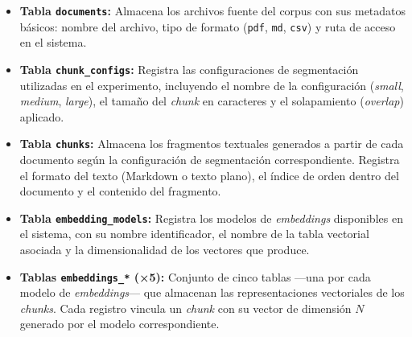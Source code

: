 \documentclass{article}
\begin{document}
\begin{itemize}
  \item \textbf{Tabla \texttt{documents}:} Almacena los archivos fuente del corpus con sus metadatos básicos: nombre del archivo, tipo de formato (\texttt{pdf}, \texttt{md}, \texttt{csv}) y ruta de acceso en el sistema.
  \item \textbf{Tabla \texttt{chunk\_configs}:} Registra las configuraciones de segmentación utilizadas en el experimento, incluyendo el nombre de la configuración (\textit{small}, \textit{medium}, \textit{large}), el tamaño del \textit{chunk} en caracteres y el solapamiento (\textit{overlap}) aplicado.
  \item \textbf{Tabla \texttt{chunks}:} Almacena los fragmentos textuales generados a partir de cada documento según la configuración de segmentación correspondiente. Registra el formato del texto (Markdown o texto plano), el índice de orden dentro del documento y el contenido del fragmento.
  \item \textbf{Tabla \texttt{embedding\_models}:} Registra los modelos de \textit{embeddings} disponibles en el sistema, con su nombre identificador, el nombre de la tabla vectorial asociada y la dimensionalidad de los vectores que produce.
  \item \textbf{Tablas \texttt{embeddings\_*} (×5):} Conjunto de cinco tablas —una por cada modelo de \textit{embeddings}— que almacenan las representaciones vectoriales de los \textit{chunks}. Cada registro vincula un \textit{chunk} con su vector de dimensión $N$ generado por el modelo correspondiente.
\end{itemize}

\end{document}
